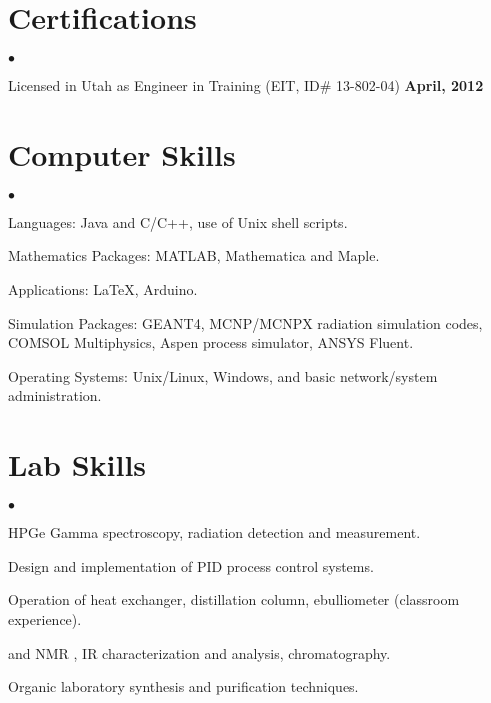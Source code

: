 \documentclass[margin,line]{res}
\newenvironment{list2}{
  \begin{list}{$\bullet$}{%
      \setlength{\itemsep}{0in}
      \setlength{\parsep}{0in} \setlength{\parskip}{0in}
      \setlength{\topsep}{0in} \setlength{\partopsep}{0in} 
      \setlength{\leftmargin}{0.2in}}}{\end{list}}
\begin{document}
\begin{resume}
\section{\sc Certifications} 
\begin{list2}
\item Licensed in Utah as Engineer in Training (EIT, ID\# 13-802-04) \hfill{\bf April, 2012}
\end{list2}


\section{\sc Computer Skills} 
\begin{list2}
\item Languages:   Java and C/C++,  use of Unix shell scripts.
\item Mathematics Packages:   MATLAB, Mathematica and Maple.
\item Applications: \LaTeX, Arduino.
\item Simulation Packages: GEANT4, MCNP/MCNPX radiation simulation codes, \\COMSOL Multiphysics, Aspen process simulator, ANSYS Fluent.
\item Operating Systems:  Unix/Linux, Windows, and basic network/system administration.
\end{list2}


\section{\sc Lab Skills} 
\begin{list2}
\item HPGe Gamma spectroscopy, radiation detection and measurement.
\item Design and implementation of PID process control systems.
\item Operation of heat exchanger, distillation column, ebulliometer (classroom experience).
\item {} and  NMR , IR characterization and analysis, chromatography.
\item Organic laboratory synthesis and purification techniques.
\end{list2}





\end{resume}
\end{document}
